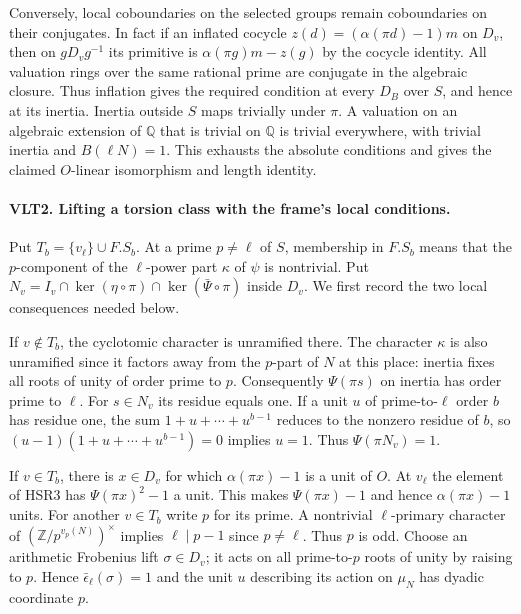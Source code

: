 Conversely, local coboundaries on the selected groups remain
coboundaries on their conjugates. In fact if an inflated cocycle
$z(d)=(\alpha(\pi d)-1)m$ on $D_v$, then on $gD_vg^{-1}$ its primitive
is $\alpha(\pi g)m-z(g)$ by the cocycle identity. All valuation rings
over the same rational prime are conjugate in the algebraic closure.
Thus inflation gives the required condition at every $D_B$ over $S$,
and hence at its inertia. Inertia outside $S$ maps trivially under
$\pi$. A valuation on an algebraic extension of $\mathbb Q$ that is
trivial on $\mathbb Q$ is trivial everywhere, with trivial inertia and
$B(\ell N)=1$. This exhausts the absolute conditions and gives the
claimed $O$-linear isomorphism and length identity.

\paragraph{VLT2. Lifting a torsion class with the frame's local conditions.}
\label{claim:VLT2}
Put $T_b=\{v_\ell\}\cup F.S_b$. At a prime $p\ne\ell$ of $S$,
membership in $F.S_b$ means that the $p$-component of the
$\ell$-power part $\kappa$ of $\psi$ is nontrivial. Put
$N_v=I_v\cap\ker(\eta\circ\pi)\cap\ker(\bar\Psi\circ\pi)$ inside $D_v$.
We first record the two local consequences needed below.

If $v\notin T_b$, the cyclotomic character is unramified there.
The character $\kappa$ is also unramified since it factors away from
the $p$-part of $N$ at this place: inertia fixes all roots of unity
of order prime to $p$. Consequently $\Psi(\pi s)$ on inertia has
order prime to $\ell$. For $s\in N_v$ its residue equals one. If a
unit $u$ of prime-to-$\ell$ order $b$ has residue one, the sum
$1+u+\cdots+u^{b-1}$ reduces to the nonzero residue of $b$, so
$(u-1)(1+u+\cdots+u^{b-1})=0$ implies $u=1$. Thus $\Psi(\pi N_v)=1$.

If $v\in T_b$, there is $x\in D_v$ for which $\alpha(\pi x)-1$
is a unit of $O$. At $v_\ell$ the element of HSR3 has
$\Psi(\pi x)^2-1$ a unit. This makes $\Psi(\pi x)-1$ and hence
$\alpha(\pi x)-1$ units. For another $v\in T_b$ write $p$ for its
prime. A nontrivial $\ell$-primary character of
$(\mathbb Z/p^{v_p(N)})^\times$ implies $\ell\mid p-1$ since
$p\ne\ell$. Thus $p$ is odd. Choose an arithmetic Frobenius lift
$\sigma\in D_v$; it acts on all prime-to-$p$ roots of unity by
raising to $p$. Hence $\bar\epsilon_\ell(\sigma)=1$ and the unit
$u$ describing its action on $\mu_N$ has dyadic coordinate $p$.

